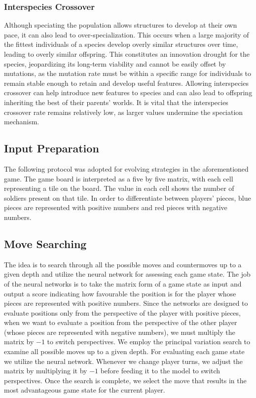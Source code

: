 \documentclass[letterpaper, 12pt]{article}
\begin{document}
\subsubsection*{Interspecies Crossover}
Although speciating the population allows structures to develop at their own pace, it
can also lead to over-specialization. This occurs when a large majority of the fittest
individuals of a species develop overly similar structures over time, leading to overly
similar offspring. This constitutes an innovation drought for the species, jeopardizing
its long-term viability and cannot be easily offset by mutations, as the mutation rate
must be within a specific range for individuals to remain stable enough to retain and
develop useful features. Allowing interspecies crossover can help introduce new features
to species and can also lead to offspring inheriting the best of their parents' worlds.
It is vital that the interspecies crossover rate remains relatively low, as larger
values undermine the speciation mechanism.

\subsection*{Input Preparation}
The following protocol was adopted for evolving strategies in the aforementioned game.
The game board is interpreted as a five by five matrix, with each cell representing a
tile on the board. The value in each cell shows the number of soldiers present on that
tile. In order to differentiate between players' pieces, blue pieces are represented with
positive numbers and red pieces with negative numbers.

\subsection*{Move Searching} 
The idea is to search through all the possible moves and countermoves up to a given
depth and utilize the neural network for assessing each game state. The job of the
neural networks is to take the matrix form of a game state as input and output a score
indicating how favourable the position is for the player whose pieces are represented
with positive numbers. Since the networks are designed to evaluate positions only from
the perspective of the player with positive pieces, when we want to evaluate a position
from the perspective of the other player (whose pieces are represented with negative
numbers), we must multiply the matrix by \(-1\) to switch perspectives. We employ the
principal variation search to examine all possible moves up to a given depth. For
evaluating each game state we utilize the neural network. Whenever we change player
turns, we adjust the matrix by multiplying it by \(-1\) before feeding it to the model
to switch perspectives. Once the search is complete, we select the move that results in
the most advantageous game state for the current player.
\end{document}
